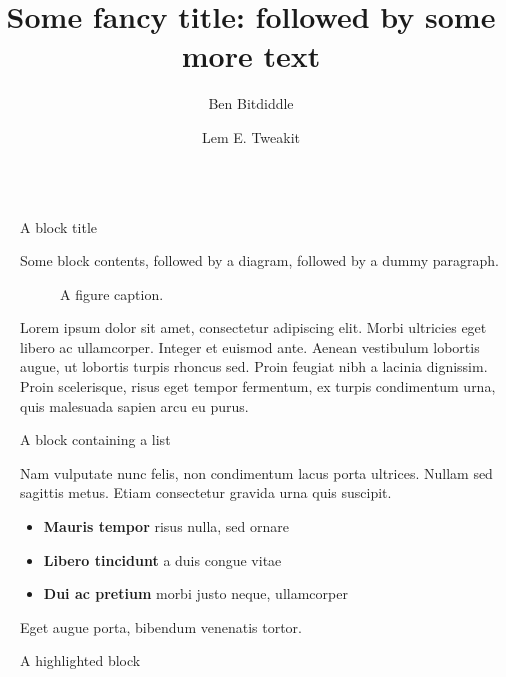 \documentclass[final]{beamer}
\title{Some fancy title: followed by some more text}
\author{\culineheading{black}{Alyssa P. Hacker} \inst{1} \and Ben Bitdiddle \inst{2} \and Lem E. Tweakit \inst{2}}
\institute[shortinst]{\inst{1} Some Institute \samelineand \inst{2} Another Institute}
\newlength{\sepwidth}
\newlength{\colwidth}
\newcommand{\separatorcolumn}{\begin{column}{\sepwidth}\end{column}}
\begin{document}
\begin{frame}[t]
\begin{columns}[t]
\separatorcolumn

\begin{column}{\colwidth}

  \begin{block}{A block title}

    Some block contents, followed by a diagram, followed by a dummy paragraph.

    \begin{figure}
      \centering
      \caption{A figure caption.}
    \end{figure}

    Lorem ipsum dolor sit amet, consectetur adipiscing elit. Morbi ultricies
    eget libero ac ullamcorper. Integer et euismod ante. Aenean vestibulum
    lobortis augue, ut lobortis turpis rhoncus sed. Proin feugiat nibh a
    lacinia dignissim. Proin scelerisque, risus eget tempor fermentum, ex
    turpis condimentum urna, quis malesuada sapien arcu eu purus.

  \end{block}

  \begin{block}{A block containing a list}

    Nam vulputate nunc felis, non condimentum lacus porta ultrices. Nullam sed
    sagittis metus. Etiam consectetur gravida urna quis suscipit.

    \begin{itemize}
      \item \textbf{Mauris tempor} risus nulla, sed ornare
      \item \textbf{Libero tincidunt} a duis congue vitae
      \item \textbf{Dui ac pretium} morbi justo neque, ullamcorper
    \end{itemize}

    Eget augue porta, bibendum venenatis tortor.

  \end{block}

  \begin{alertblock}{A highlighted block}


\end{alertblock}
\end{column}
\end{columns}
\end{frame}
\end{document}
